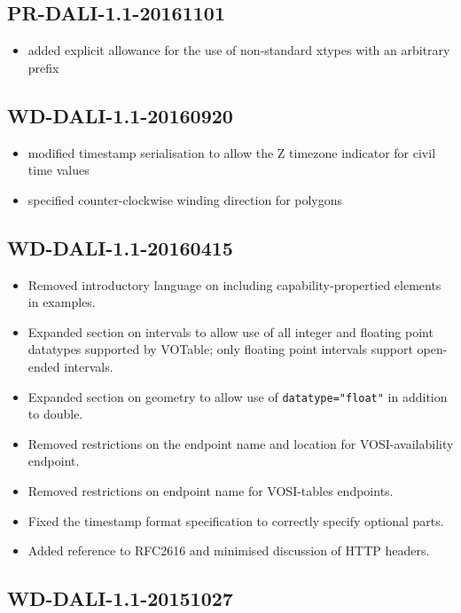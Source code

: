 \documentclass[11pt,letter]{ivoa}
\begin{document}
\subsection{PR-DALI-1.1-20161101}

\begin{itemize}
\item added explicit allowance for the use of non-standard xtypes with an
arbitrary prefix
\end{itemize}

\subsection{WD-DALI-1.1-20160920}

\begin{itemize}
\item modified timestamp serialisation to allow the Z timezone indicator for
civil time values
\item specified counter-clockwise winding direction for polygons
\end{itemize}

\subsection{WD-DALI-1.1-20160415}

\begin{itemize}
\item Removed introductory language on including capability-propertied elements in
examples.
\item Expanded section on intervals to allow use of all integer and floating point datatypes
supported by VOTable; only floating point intervals support open-ended intervals.
\item Expanded section on geometry to allow use of \verb|datatype="float"| in addition to double.
\item Removed restrictions on the endpoint name and location for VOSI-availability endpoint.
\item Removed restrictions on endpoint name for VOSI-tables endpoints.
\item Fixed the timestamp format specification to correctly specify optional parts.
\item Added reference to RFC2616 and minimised discussion of HTTP headers.
\end{itemize}

\subsection{WD-DALI-1.1-20151027}
\end{document}
